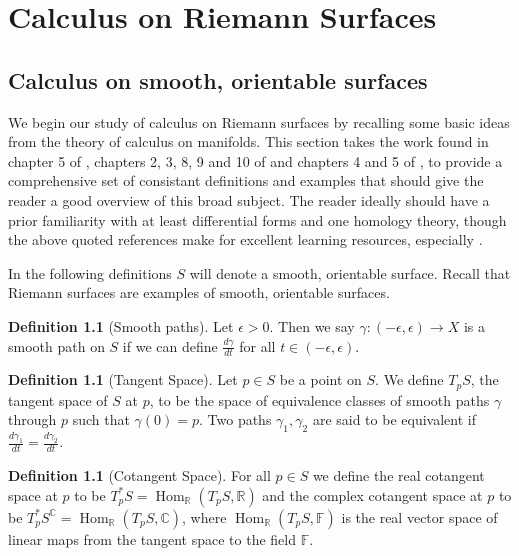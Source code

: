 \documentclass[11pt]{report}
\theoremstyle{definition}
\newtheorem{defn}[thm]{Definition}
\DeclareMathOperator{\Hom}{Hom}
\begin{document}
\newpage 
\chapter{Calculus on Riemann Surfaces}

\section{Calculus on smooth, orientable surfaces}
We begin our study of calculus on Riemann surfaces by recalling some basic ideas from the theory of calculus on manifolds. This section takes the work found in chapter 5 of \cite{donaldson}, chapters 2, 3, 8, 9 and 10 of \cite{calcohomo} and chapters 4 and 5 of \cite{spivak}, to provide a comprehensive set of consistant definitions and examples that should give the reader a good overview of this broad subject. The reader ideally should have a prior familiarity with at least differential forms and one homology theory, though the above quoted references make for excellent learning resources, especially \cite{calcohomo}. 

In the following definitions $S$ will denote a smooth, orientable surface. Recall that Riemann surfaces are examples of smooth, orientable surfaces. 

\begin{defn}[Smooth paths]\label{Smooth Path}
  Let $\epsilon > 0$. Then we say $\gamma:(-\epsilon,\epsilon) \rightarrow X$ is a smooth path on $S$ if we can define $\frac{d\gamma}{dt}$ for all $t \in (-\epsilon,\epsilon)$.
\end{defn}

\begin{defn}[Tangent Space]\label{TpX}
  Let $p \in S$ be a point on $S$. We define $T_pS$, the tangent space of $S$ at
  $p$, to be the space of equivalence classes of smooth paths $\gamma$ through $p$ such that $\gamma(0)=p$. Two paths $\gamma_1, \gamma_2$ are said to be
  equivalent if $\frac{d\gamma_1}{dt}=\frac{d\gamma_2}{dt}$.
\end{defn}

\begin{defn}[Cotangent Space]\label{T*pX}
  For all $p \in S$ we define the real cotangent space at $p$ to be
  $T^*_pS = \Hom_{\mathbb{R}}(T_pS, \mathbb{R})$ and the complex cotangent
  space at $p$ to be $T^*_pS^{\mathbb{C}} = \Hom_{\mathbb{R}}(T_pS,\mathbb{C})$, where $\Hom_{\mathbb{R}}(T_pS, \mathbb{F})$ is the real vector space of linear maps from the tangent space to the field $\mathbb{F}$.
\end{defn}
\end{document}
